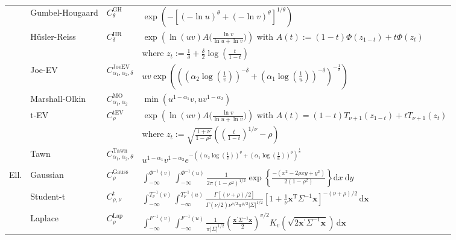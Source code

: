 \documentclass{article}
\def\of#1{\left(#1\right)} %
\def\inbrackets#1{\of{#1}} %
\newcommand{\bsx}{\boldsymbol{x}}
\newcommand{\de}{\mathrm{\,d}}
\begin{document}
\begin{table}[tbp]
\begin{center}
{\begin{tabular}{llll}
            & Gumbel-Hougaard & $C^{\text{GH}}_{\theta}$ & $\exp (-[(-\ln u)^\theta+(-\ln v)^\theta]^{1 / \theta})$ \\
            & Hüsler-Reiss & $C^{\text{HR}}_{\delta}$ & $\exp\left( \ln(uv) A\Big(\frac{\ln v}{\ln u + \ln v}\Big) \right) $ with $A(t):= (1-t)\Phi(z_{1-t}) + t\Phi(z_t)$ \\
            & & & where $z_t := \frac1\delta + \frac{\delta}2\log\of{\frac{t}{1-t}}$ \\
            & Joe-EV & $C^{\text{JoeEV}}_{\alpha_1,\alpha_2,\delta}$ & $uv\exp\of{\left(\left(\alpha_{2} \log\of{\frac1v}\right)^{- \delta} + \left(\alpha_{1}\log\of{\frac1u}\right)^{- \delta}\right)^{- \frac{1}{\delta}}} $ \\
            & Marshall-Olkin & $C^{\text{MO}}_{\alpha_1, \alpha_2}$ & $\min \left(u^{1-\alpha_1} v, u v^{1-\alpha_2}\right)$\\
            & t-EV & $C^{\text{tEV}}_{\rho}$ & $\exp\left( \ln(uv) A\Big(\frac{\ln v}{\ln u + \ln v}\Big) \right) $ with $A(t) = (1-t)T_{\nu + 1}(z_{1-t}) + t T_{\nu + 1}(z_t)$ \\
            & & & where $z_t := \sqrt{\frac{1+\nu}{1-\rho^2}}\inbrackets{\of{\frac{t}{1-t}}^{1/\nu}-\rho}$ \\
            & Tawn & $C^{\text{Tawn}}_{\alpha_1,\alpha_2, \theta}$ & $u^{1-\alpha_1}v^{1-\alpha_2}e^{-\left(\left(\alpha_{2} \log\of{\frac1v}\right)^{\theta} + \left(\alpha_{1}\log\of{\frac1u}\right)^{\theta}\right)^{\frac{1}{\theta}}} $ \\
            \midrule
            Ell. & Gaussian & $C^{\text{Gauss}}_{\rho}$ & $\int_{-\infty}^{\Phi^{-1}\left(v\right)} \int_{-\infty}^{\Phi^{-1}\left(u\right)} \frac{1}{2 \pi\left(1-\rho^2\right)^{1 / 2}} \exp \left\{\frac{-\left(x^2-2 \rho x y+y^2\right)}{2\left(1-\rho^2\right)}\right\} \mathrm{d} x \mathrm{~d} y$  \\
            & Student-t & $C^{\text{t}}_{\rho, \nu}$ & $\int_{-\infty}^{T_\nu^{-1}\left(v\right)} \int_{-\infty}^{T_\nu^{-1}\left(u\right)}\frac{\Gamma[(\nu+\rho) / 2]}{\Gamma(\nu / 2) \nu^{\rho / 2} \pi^{\rho / 2}|\Sigma|^{1 / 2}}\left[1+\frac{1}{\nu}\bsx^{\mathrm{T}} \Sigma^{-1}\bsx\right]^{-(\nu+\rho) / 2}  \de \bsx$\\
            & Laplace & $C^{\text{Lap}}_{\rho}$ & $\int_{-\infty}^{F^{-1}\left(v\right)} \int_{-\infty}^{F^{-1}\left(u\right)} \frac{1}{\pi|\Sigma|^{1/2}}\left(\frac{\bsx^{\prime} \Sigma^{-1} \bsx}{2}\right)^{v / 2} K_v\left(\sqrt{2 \bsx^{\prime} \Sigma^{-1} \bsx}\right) \de \bsx$\\

\end{tabular}}
\end{center}
\end{table}
\end{document}
